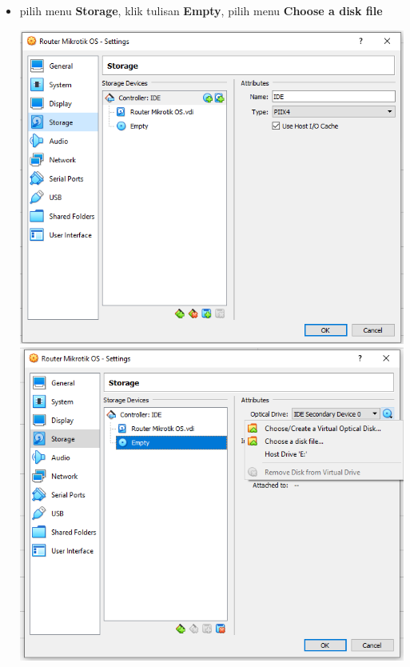 \documentclass{article}
\begin{document}
\begin{flushleft}
\begin{itemize}
			\item pilih menu \textbf{Storage}, klik tulisan \textbf{Empty}, pilih menu \textbf{Choose a disk file}
				\begin{center}
					\includegraphics[scale=0.6]{(b)} \\
					\includegraphics[scale=0.6]{(c)} 
				\end{center}
				

\end{itemize}
\end{flushleft}
\end{document}
